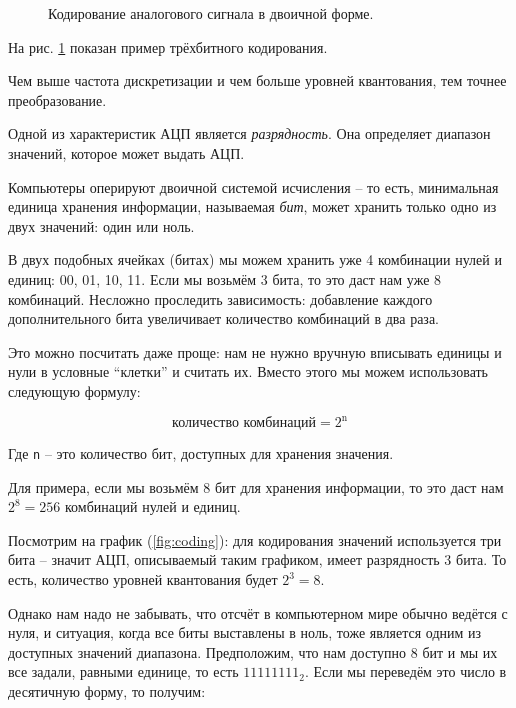 \documentclass[../sparc.tex]{subfiles}
\begin{document}
\begin{enumerate}
\begin{figure}[H]
    \caption{Кодирование аналогового сигнала в двоичной форме.}
    \label{fig:encoding}
  \end{figure}

  На рис. \ref{fig:encoding} показан пример трёхбитного кодирования.

  Чем выше частота дискретизации и чем больше уровней квантования, тем точнее
  преобразование.

\end{enumerate}

Одной из характеристик АЦП является \emph{разрядность}.  Она определяет диапазон
значений, которое может выдать АЦП.

Компьютеры оперируют двоичной системой исчисления -- то есть, минимальная единица
хранения информации, называемая \emph{бит}, может хранить только одно из двух
значений: один или ноль.

В двух подобных ячейках (битах) мы можем хранить уже 4 комбинации нулей и
единиц: 00, 01, 10, 11.  Если мы возьмём 3 бита, то это даст нам уже 8
комбинаций.  Несложно проследить зависимость: добавление каждого дополнительного
бита увеличивает количество комбинаций в два раза.

Это можно посчитать даже проще: нам не нужно вручную вписывать единицы и нули в
условные ``клетки'' и считать их.  Вместо этого мы можем использовать следующую
формулу:

\begin{equation}
  \mbox{количество комбинаций} = 2^{\mbox{n}}
\end{equation}

Где \texttt{n} -- это количество бит, доступных для хранения значения.

Для примера, если мы возьмём 8 бит для хранения информации, то это даст нам $2^8
= 256$ комбинаций нулей и единиц.

Посмотрим на график (\ref{fig:coding}): для кодирования значений используется
три бита -- значит АЦП, описываемый таким графиком, имеет разрядность 3 бита.  То
есть, количество уровней квантования будет $2^3 = 8$.

Однако нам надо не забывать, что отсчёт в компьютерном мире обычно ведётся с
нуля, и ситуация, когда все биты выставлены в ноль, тоже является одним из
доступных значений диапазона.  Предположим, что нам доступно 8 бит и мы их все
задали, равными единице, то есть $11111111_2$.  Если мы переведём это число в
десятичную форму, то получим:
\end{document}
